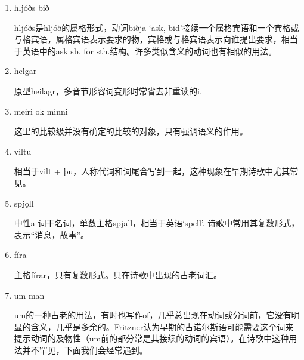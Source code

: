 \begin{grammar*}{}
    \begin{enumerate}[leftmargin=*]
        \item hljóðs bið

              hljóðs是hljóð的属格形式，动词biðja `ask, bid'接续一个属格宾语和一个宾格或与格宾语，属格宾语表示要求的物，宾格或与格宾语表示向谁提出要求，相当于英语中的ask sb. for sth.结构。许多类似含义的动词也有相似的用法。

        \item helgar

              原型heilagr，多音节形容词变形时常省去非重读的i.

        \item meiri ok minni

              这里的比较级并没有确定的比较的对象，只有强调语义的作用。

        \item viltu

              相当于vilt + þu，人称代词和词尾合写到一起，这种现象在早期诗歌中尤其常见。

        \item spjǫll

              中性a-词干名词，单数主格spjall，相当于英语`spell'. 诗歌中常用其复数形式，表示“消息，故事”。
        \item fíra

              主格fírar，只有复数形式。只在诗歌中出现的古老词汇。
        \item um man

              um的一种古老的用法，有时也写作of，几乎总出现在动词或分词前，它没有明显的含义，几乎是多余的。Fritzner认为早期的古诺尔斯语可能需要这个词来提示动词的及物性（um前的部分常是其接续的动词的宾语）。在诗歌中这种用法并不罕见，下面我们会经常遇到。
    \end{enumerate}
\end{grammar*}
\medskip %
